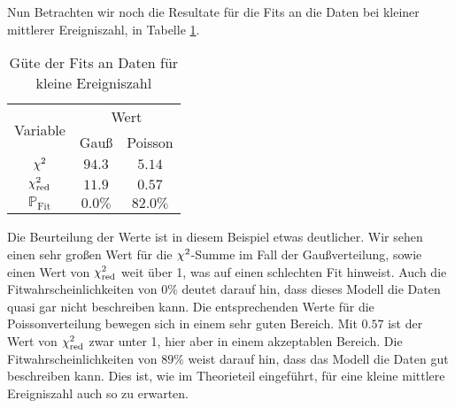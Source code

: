 Nun Betrachten wir noch die Resultate für die Fits an die Daten bei kleiner mittlerer Ereigniszahl, in Tabelle \ref{tab:fit_goodness_small}.

\renewcommand{\arraystretch}{1.3}
\begin{table}[H]
  \centering
  \begin{tabular}{c|c|c}
    \multirow{2}{*}{Variable} & \multicolumn{2}{c}{Wert}\\\cline{2-3}
    & Gauß & Poisson\\\hline
    $\chi^{2}$ & $94.3$ & $5.14$\\
    $\chi^{2}_{\mathrm{red}}$ & $11.9$ & $0.57$\\
    $\mathbb{P}_{\mathrm{Fit}}$ & $0.0 \%$ & $82.0\%$
  \end{tabular}
  \caption{Güte der Fits an Daten für kleine Ereigniszahl}
  \label{tab:fit_goodness_small}
\end{table}
\renewcommand{\arraystretch}{1}

Die Beurteilung der Werte ist in diesem Beispiel etwas deutlicher. Wir sehen einen sehr großen Wert für die $\chi^{2}$-Summe im Fall der Gaußverteilung, sowie einen Wert von $\chi^{2}_{\mathrm{red}}$ weit über 1, was auf einen schlechten Fit hinweist. Auch die Fitwahrscheinlichkeiten von $0\%$ deutet darauf hin, dass dieses Modell die Daten quasi gar nicht beschreiben kann. Die entsprechenden Werte für die Poissonverteilung bewegen sich in einem sehr guten Bereich. Mit $0.57$ ist der Wert von $\chi^{2}_{\mathrm{red}}$ zwar unter 1, hier aber in einem akzeptablen Bereich. Die Fitwahrscheinlichkeiten von $89\%$ weist darauf hin, dass das Modell die Daten gut beschreiben kann. Dies ist, wie im Theorieteil eingeführt, für eine kleine mittlere Ereigniszahl auch so zu erwarten.